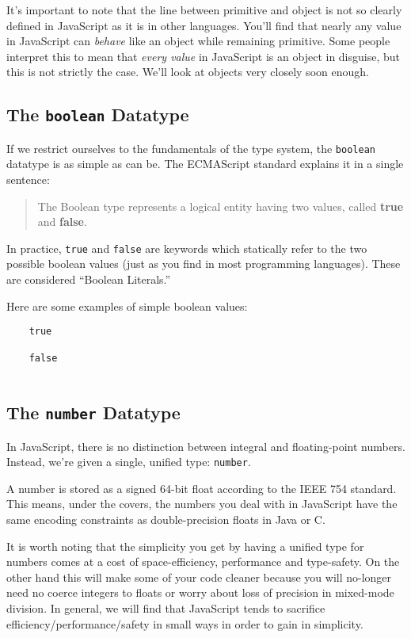 \documentclass[11pt,letter]{book}
\begin{document}
    It's important to note that the line between primitive and object is not so clearly defined
    in JavaScript as it is in other languages. You'll find that nearly any value in JavaScript can
    \emph{behave} like an object while remaining primitive. Some people interpret this to mean that
    \emph{every value} in JavaScript is an object in disguise, but this is not strictly the case.
    We'll look at objects very closely soon enough.
    
    \subsection{The \texttt{boolean} Datatype}
    If we restrict ourselves to the fundamentals of the type system, the \texttt{boolean} 
    datatype is as simple as can be. The ECMAScript standard explains it in a single sentence:
    
    \begin{quote}
        The Boolean type represents a logical entity having two values, called \textbf{true}
        and \textbf{false}.
    \end{quote}
    
    In practice, \texttt{true} and \texttt{false} are keywords which  statically refer to the two 
    possible boolean values (just as you find in most programming languages). These are considered 
    ``Boolean Literals.''
    
    Here are some examples of simple boolean values:
    
    \begin{verbatim}
    true
    
    false
    
    \end{verbatim}
    
    \subsection{The \texttt{number} Datatype}
    In JavaScript, there is no distinction between integral and floating-point numbers. Instead, 
    we're given a single, unified type: \texttt{number}.
    
    A number is stored as a signed 64-bit float according to the IEEE 754 standard. This means, 
    under the covers, the numbers you deal with in JavaScript have the same encoding constraints as 
    double-precision floats in Java or C.
    
    It is worth noting that the simplicity you get by having a unified type for numbers comes at 
    a cost of space-efficiency, performance and type-safety. On the other hand this will make 
    some of your code cleaner because you will no-longer need no coerce integers to floats or 
    worry about loss of precision in mixed-mode division. In general, we will find that 
    JavaScript tends to sacrifice efficiency/performance/safety in small ways in order to gain 
    in simplicity.
    
\end{document}
